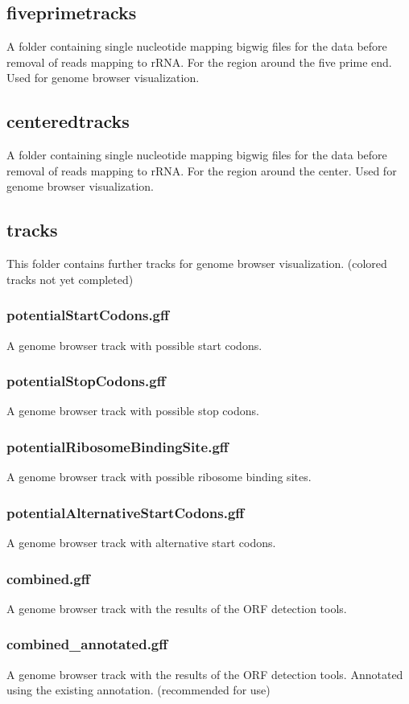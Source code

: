 \documentclass[10pt,a4paper]{article}
\begin{document}
\subsection*{fiveprimetracks}
A folder containing single nucleotide mapping bigwig files for the data before removal of reads mapping to rRNA. For the region around the five prime end. Used for genome browser visualization.
\subsection*{centeredtracks}
A folder containing single nucleotide mapping bigwig files for the data before removal of reads mapping to rRNA. For the region around the center. Used for genome browser visualization.
\subsection*{tracks}
This folder contains further tracks for genome browser visualization. (colored tracks not yet completed)
\subsubsection*{potentialStartCodons.gff}
A genome browser track with possible start codons.
\subsubsection*{potentialStopCodons.gff}
A genome browser track with possible stop codons.
\subsubsection*{potentialRibosomeBindingSite.gff}
A genome browser track with possible ribosome binding sites.
\subsubsection*{potentialAlternativeStartCodons.gff}
A genome browser track with alternative start codons.
\subsubsection*{combined.gff}
A genome browser track with the results of the ORF detection tools.
\subsubsection*{combined\_annotated.gff}
A genome browser track with the results of the ORF detection tools. Annotated using the existing annotation. (recommended for use)
\end{document}
